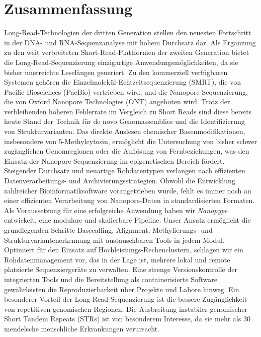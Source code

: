 \cleardoublepage
\vspace*{10mm}
\section*{Zusammenfassung}
\label{sec:zusammenfassung}

Long-Read-Technologien der dritten Generation stellen den neuesten Fortschritt in der DNA- und RNA-Sequenzanalyse mit hohem Durchsatz dar.
Als Ergänzung zu den weit verbreiteten Short-Read-Plattformen der zweiten Generation bietet die Long-Read-Sequenzierung einzigartige Anwendungsmöglichkeiten, da sie bisher unerreichte Leselängen generiert.
Zu den kommerziell verfügbaren Systemen gehören die Einzelmolekül-Echtzeitsequenzierung (SMRT), die von Pacific Biosciences (PacBio) vertrieben wird, und die Nanopore-Sequenzierung, die von Oxford Nanopore Technologies (ONT) angeboten wird.
Trotz der verbleibenden höheren Fehlerrate im Vergleich zu Short Reads sind diese bereits heute Stand der Technik für de novo Genomassemblies und die Identifizierung von Strukturvarianten.
Das direkte Auslesen chemischer Basenmodifikationen, insbesondere von 5-Methylcytosin, ermöglicht die Untersuchung von bisher schwer zugänglichen Genomregionen oder die Auflösung von Fernbeziehungen, was den Einsatz der Nanopore-Sequenzierung im epigenetischen Bereich fördert.
Steigender Durchsatz und neuartige Rohdatentypen verlangen nach effizienten Datenverarbeitungs- und Archivierungsstrategien.
Obwohl die Entwicklung zahlreicher Bioinformatiksoftware vorangetrieben wurde, fehlt es immer noch an einer effizienten Verarbeitung von Nanopore-Daten in standardisierten Formaten.
Als Voraussetzung für eine erfolgreiche Anwendung haben wir \textit{Nanopype} entwickelt, eine modulare und skalierbare Pipeline. 
Unser Ansatz ermöglicht die grundlegenden Schritte Basecalling, Alignment, Methylierungs- und Strukturvariantenerkennung mit austauschbaren Tools in jedem Modul.
Optimiert für den Einsatz auf Hochleistungs-Rechenclustern, schlagen wir ein Rohdatenmanagement vor, das in der Lage ist, mehrere lokal und remote platzierte Sequenziergeräte zu verwalten.
Eine strenge Versionskontrolle der integrierten Tools und die Bereitstellung als containerisierte Software gewährleisten die Reproduzierbarkeit über Projekte und Labore hinweg.
Ein besonderer Vorteil der Long-Read-Sequenzierung ist die bessere Zugänglichkeit von repetitiven genomischen Regionen.
Die Ausbreitung instabiler genomischer Short Tandem Repeats (STRs) ist von besonderem Interesse, da sie mehr als 30 mendelsche menschliche Erkrankungen verursacht.
